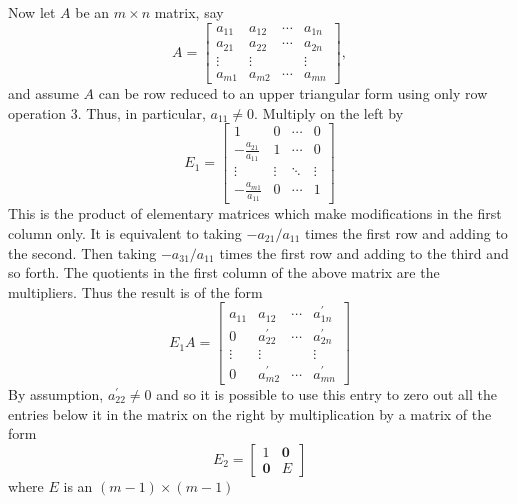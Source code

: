 \documentclass{ximera}
\begin{document}
Now let $A$ be an $m\times n$ matrix, say
\begin{equation*}
A=
\begin{bmatrix}
a_{11} & a_{12} & \cdots & a_{1n} \\
a_{21} & a_{22} & \cdots & a_{2n} \\
\vdots & \vdots &  & \vdots \\
a_{m1} & a_{m2} & \cdots & a_{mn}
\end{bmatrix},
\end{equation*}
and assume $A$ can be row reduced to an upper triangular form using only row
operation 3. Thus, in particular, $a_{11}\neq 0$. Multiply on the left by 
\begin{equation*}
E_{1}=
\begin{bmatrix}
1 & 0 & \cdots & 0 \\
-
\frac{a_{21}}{a_{11}} & 1 & \cdots & 0 \\
\vdots & \vdots & \ddots & \vdots \\
-\frac{a_{m1}}{a_{11}} & 0 & \cdots & 1
\end{bmatrix}
\end{equation*}
This is the product of elementary matrices which make modifications in the
first column only. It is equivalent to taking $-a_{21}/a_{11}$ times the
first row and adding to the second. Then taking $-a_{31}/a_{11}$ times the
first row and adding to the third and so forth. The quotients in the first
column of the above matrix are the multipliers. Thus the result is of the
form
\begin{equation*}
E_{1}A=
\begin{bmatrix}
a_{11} & a_{12} & \cdots & a_{1n}^{\prime } \\
0 & a_{22}^{\prime } & \cdots & a_{2n}^{\prime } \\
\vdots & \vdots &  & \vdots \\
0 & a_{m2}^{\prime } & \cdots & a_{mn}^{\prime }
\end{bmatrix}
\end{equation*}
By assumption, $a_{22}^{\prime }\neq 0$ and so it is possible to use this
entry to zero out all the entries below it in the matrix on the right by
multiplication by a matrix of the form 
\begin{equation*}
E_{2}=
\begin{bmatrix}
1 & \mathbf{0} \\
\mathbf{0} & E
\end{bmatrix}
\end{equation*}
where $E$ is an $( m-1)\times ( m-1)$
\end{document}
